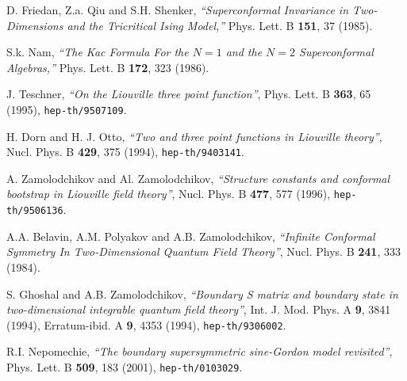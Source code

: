 \documentclass[a4paper,12pt]{article}
\begin{document}
 D. Friedan, Z.a. Qiu and S.H. Shenker,
    {\sl ``Superconformal Invariance in Two-Dimensions
           and the Tricritical Ising Model,''}
    Phys. Lett. B {\bf 151}, 37 (1985).

 S.k. Nam,
    {\sl ``The Kac Formula For the $N=1$ and the $N=2$
           Superconformal Algebras,''}
    Phys. Lett. B {\bf 172}, 323 (1986).

 J. Teschner,
    {\sl ``On the Liouville three point function''},
    Phys. Lett. B {\bf 363}, 65 (1995), {\tt hep-th/9507109}.

 H. Dorn and H. J. Otto,
    {\sl ``Two and three point functions in Liouville theory''},
    Nucl. Phys. B {\bf 429}, 375 (1994), {\tt hep-th/9403141}.

 A. Zamolodchikov and Al. Zamolodchikov,
    {\sl ``Structure constants and conformal bootstrap
           in Liouville field theory''},
    Nucl. Phys. B {\bf 477}, 577 (1996), {\tt hep-th/9506136}.

 A.A. Belavin, A.M. Polyakov and A.B. Zamolodchikov,
    {\sl ``Infinite Conformal Symmetry In Two-Dimensional
           Quantum Field Theory''},
    Nucl. Phys. B {\bf 241}, 333 (1984).

 S. Ghoshal and A.B. Zamolodchikov,
    {\sl ``Boundary S matrix and boundary state
           in two-dimensional integrable quantum field theory''},
    Int. J. Mod. Phys. A {\bf 9}, 3841 (1994),
    Erratum-ibid. A {\bf 9}, 4353 (1994),
    {\tt hep-th/9306002}.

 R.I. Nepomechie,
    {\sl ``The boundary supersymmetric sine-Gordon model revisited''},
    Phys. Lett. B {\bf 509}, 183 (2001),
    {\tt hep-th/0103029}.
\end{document}
